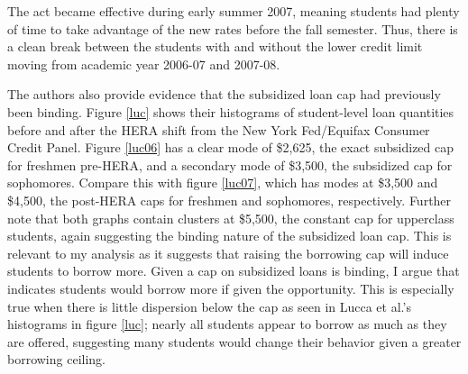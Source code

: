 \documentclass[12pt]{article}
\begin{document}
	The act became effective during early summer 2007, meaning students had plenty of time to take advantage of the new rates before the fall semester. Thus, there is a clean break between the students with and without the lower credit limit moving from academic year 2006-07 and 2007-08.
	
	The authors also provide evidence that the subsidized loan cap had previously been binding. Figure \ref{luc} shows their histograms of student-level loan quantities before and after the HERA shift from the New York Fed/Equifax Consumer Credit Panel. Figure \ref{luc06} has a clear mode of \$2,625, the exact subsidized cap for freshmen pre-HERA, and a secondary mode of \$3,500, the subsidized cap for sophomores. Compare this with figure \ref{luc07}, which has modes at \$3,500 and \$4,500, the post-HERA caps for freshmen and sophomores, respectively. Further note that both graphs contain clusters at \$5,500, the constant cap for upperclass students, again suggesting the binding nature of the subsidized loan cap. This is relevant to my analysis as it suggests that raising the borrowing cap will induce students to borrow more. Given a cap on subsidized loans is binding, I argue that indicates students would borrow more if given the opportunity. This is especially true when there is little dispersion below the cap as seen in Lucca et al.'s histograms in figure \ref{luc}; nearly all students appear to borrow as much as they are offered, suggesting many students would change their behavior given a greater borrowing ceiling.
	
\end{document}
